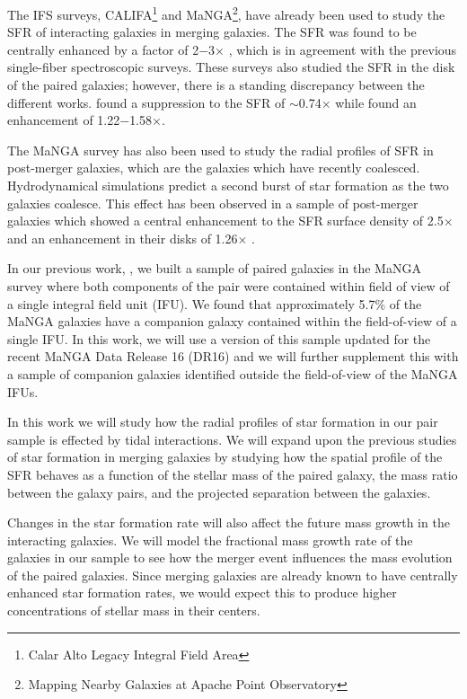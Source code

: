 \documentclass[iop,revtex4,twocolumn,apj,numberedappendix,appendixfloats]{emulateapj}
\begin{document}
The IFS surveys, CALIFA\footnote{Calar Alto Legacy Integral Field Area} and MaNGA\footnote{Mapping Nearby Galaxies at Apache Point Observatory}, have already been used to study the SFR of interacting galaxies in merging galaxies. The SFR was found to be centrally enhanced by a factor of 2$-$3$\times$ \citep{Barrera-Ballesteros:2015, Pan:2019}, which is in agreement with the previous single-fiber spectroscopic surveys. These surveys also studied the SFR in the disk of the paired galaxies; however, there is a standing discrepancy between the different works. \citet{Barrera-Ballesteros:2015} found a suppression to the SFR of $\sim$0.74$\times$ while \citet{Pan:2019} found an enhancement of 1.22$-$1.58$\times$. 

The MaNGA survey has also been used to study the radial profiles of SFR in post-merger galaxies, which are the galaxies which have recently coalesced. Hydrodynamical simulations predict a second burst of star formation as the two galaxies coalesce. This effect has been observed in a sample of post-merger galaxies which showed a central enhancement to the SFR surface density of 2.5$\times$ and an enhancement in their disks of 1.26$\times$ \citep{Thorp:2019}.

In our previous work, \citet{Fu:2018}, we built a sample of paired galaxies in the MaNGA survey where both components of the pair were contained within field of view of a single integral field unit (IFU). We found that approximately 5.7\% of the MaNGA galaxies have a companion galaxy contained within the field-of-view of a single IFU. In this work, we will use a version of this sample updated for the recent MaNGA Data Release 16 (DR16) \citep{Ahumada:2020} and we will further supplement this with a sample of companion galaxies identified outside the field-of-view of the MaNGA IFUs. 

In this work we will study how the radial profiles of star formation in our pair sample is effected by tidal interactions. We will expand upon the previous studies of star formation in merging galaxies by studying how the spatial profile of the SFR behaves as a function of the stellar mass of the paired galaxy, the mass ratio between the galaxy pairs, and the projected separation between the galaxies. 


Changes in the star formation rate will also affect the future mass growth in the interacting galaxies. We will model the fractional mass growth rate of the galaxies in our sample to see how the merger event influences the mass evolution of the paired galaxies. Since merging galaxies are already known to have centrally enhanced star formation rates, we would expect this to produce higher concentrations of stellar mass in their centers.
\end{document}
